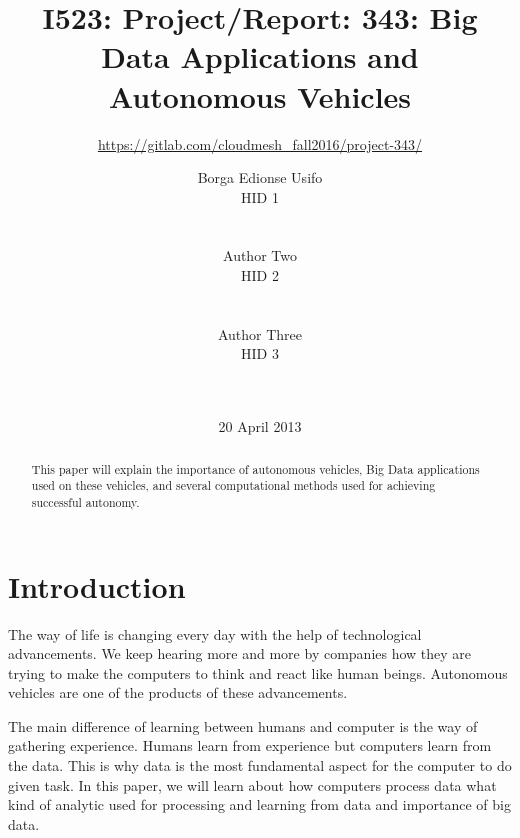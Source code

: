 \documentclass{acm_proc_article-sp}
\begin{document}
\title{I523: Project/Report: 343: Big Data Applications and Autonomous Vehicles}

\subtitle{\url{https://gitlab.com/cloudmesh_fall2016/project-343/}}

\author{
\alignauthor
Borga Edionse Usifo\\
HID 1\\
       \\
       \\
\alignauthor
Author Two\\
HID 2\\
       \\
       \\
\alignauthor
Author Three\\ 
HID 3\\
       \\
       \\
}

\date{20 April 2013}


\maketitle
\begin{abstract}
This paper will explain the importance of autonomous vehicles, Big Data applications used on these vehicles, and several computational methods used for achieving successful autonomy. 
\end{abstract}

\section{Introduction}
The way of life is changing every day with the help of technological advancements. We keep hearing more and more by companies how they are trying to make the computers to think and react like human beings. Autonomous vehicles are one of the products of these advancements. 
\par The main difference of learning between humans and computer is the way of gathering experience. Humans learn from experience but computers learn from the data. This is why data is the most fundamental aspect for the computer to do given task. In this paper, we will learn about how computers process data what kind of analytic used for processing and learning from data and importance of big data.    
\end{document}
